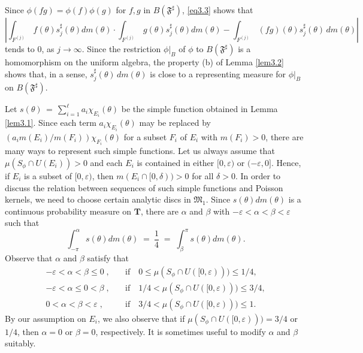 \documentclass[12pt]{amsart}
\theoremstyle{plain}
\numberwithin{equation}{section}
\begin{document}
Since $\phi(fg)=\phi(f)\phi(g)$ for $f,g$ in $B(\mathfrak{F}^\sharp)$,
\eqref{eq3.3} shows that
\begin{equation*}
\left \vert  \int_{F^{(j)}} \,
f(\theta)s^\sharp_j(\theta) dm(\theta)\cdot \int_{F^{(j)}} \,
g(\theta)s^\sharp_j(\theta) dm(\theta) -
\int_{F^{(j)}} \,
(fg)(\theta)s^\sharp_j(\theta)\,dm(\theta)
 \right \vert
\end{equation*}
tends to $0$, as $j \to \infty$. Since the restriction $\phi \vert_B$ of
$\phi$ to $B(\mathfrak{F}^\sharp)$ is a homomorphism on the uniform
algebra, the property (b) of Lemma \ref{lem3.2} shows that, in a sense, $s^\sharp_j(\theta)\,dm(\theta)$ is close to a representing
measure for $\phi\vert_B$ on $B(\mathfrak{F}^\sharp)$.

\medskip
Let $s(\theta)\,=\, \sum_{i=1}^{\ell} a_i
\chi_{E_i}(\theta)$ be the simple function obtained
in Lemma \ref{lem3.1}. Since each term $a_i\chi_{E_i}(\theta)$ may be replaced by
$(a_i m(E_i)/m(F_i)) \chi_{F_i}(\theta)$ for a
subset $F_i$ of $E_i$ with $m(F_i)>0$, there are
many ways to represent such simple functions. Let
us always assume that $\mu(S_\phi\cap U(E_i)) >0$
and each $E_i$ is contained in either
$[0,\varepsilon)$ or $(-\varepsilon, 0]$. Hence, if $E_i$ is a subset of
$[0,\varepsilon)$, then $m(E_i\cap [0,\delta))>0$
for all $\delta>0$.
In order to discuss the relation between sequences
of such simple functions and Poisson kernels,
we need to choose certain analytic discs in $\mathfrak{M}_1$.
Since $s(\theta)dm(\theta)$ is a continuous probability
measure on $\mathbf{T}$, there are  $\alpha$ and $\beta$ with
$-\varepsilon<\alpha<\beta<\varepsilon$ such that
\begin{equation}
\label{eq3.4}
\int_{-\pi}^\alpha s(\theta)dm(\theta)\;= \:
\frac{1}{4}\; =\;\int_\beta^{\pi} s(\theta)dm(\theta).
\end{equation}
Observe that $\alpha$ and $\beta$ satisfy that
\begin{equation}
\label{eq3.5}
\begin{aligned}
-\varepsilon<\alpha<\beta \leq 0\;,&
\quad \text{if} \quad 0\leq \mu(S_\phi\cap U([0,\varepsilon)))\leq 1/4,\\
-\varepsilon<\alpha \leq 0 <\beta \;,&
\quad \text{if} \quad 1/4 < \mu(S_\phi\cap U([0,\varepsilon)))\leq 3/4,\\
0 < \alpha<\beta <\varepsilon\;,&
\quad \text{if} \quad 3/4 < \mu(S_\phi\cap U([0,\varepsilon)))\leq 1.
\end{aligned}
\end{equation}
By our assumption on $E_i$, we also observe that if
$\mu(S_\phi\cap U([0,\varepsilon)))=3/4$ or $1/4$, then
$\alpha=0$ or $\beta=0$, respectively.
It is sometimes useful to modify $\alpha$ and $\beta$ suitably.
\end{document}

